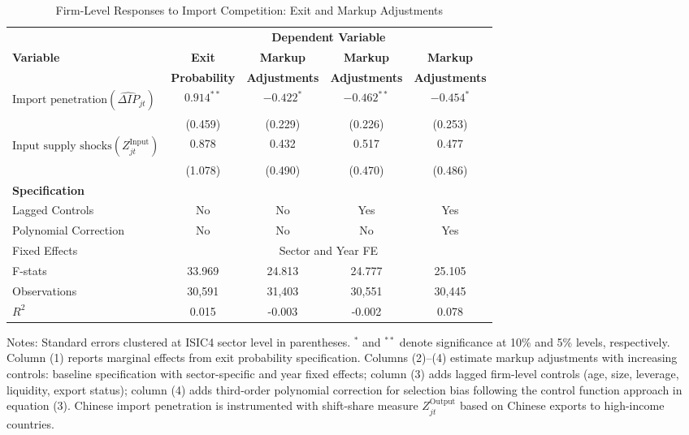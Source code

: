 \documentclass[12pt]{article}
\begin{document}
    \begin{table}[H]
    \centering
    \caption{Firm-Level Responses to Import Competition: Exit and Markup Adjustments}
    \label{tab:firm_level_responses}
    \begin{threeparttable}
    \begin{tabular}{lcccc}
    \toprule
    & \multicolumn{4}{c}{\textbf{Dependent Variable}} \\
    \cmidrule(lr){2-5}
    \textbf{Variable} & \textbf{Exit} & \textbf{Markup} & \textbf{Markup} & \textbf{Markup} \\
    & \textbf{Probability} & \textbf{Adjustments} & \textbf{Adjustments} & \textbf{Adjustments} \\
    \midrule
    $\text{Import penetration} (\widehat{\Delta IP}_{jt})$ & $0.914^{**}$ & $-0.422^{*}$ & $-0.462^{**}$ & $-0.454^{*}$ \\
    & (0.459) & (0.229) & (0.226) & (0.253) \\
    $\text{Input supply shocks} (Z_{jt}^{\text{Input}})$ & 0.878 & 0.432 & 0.517 & 0.477 \\
    & (1.078) & (0.490) & (0.470) & (0.486) \\
    \midrule
    \multicolumn{5}{l}{\textbf{Specification}} \\
    Lagged Controls & No & No & Yes & Yes \\
    Polynomial Correction & No & No & No & Yes \\
    \midrule
    Fixed Effects & \multicolumn{4}{c}{Sector and Year FE} \\
    F-stats & 33.969 & 24.813 & 24.777 & 25.105 \\
    Observations & 30,591 & 31,403 & 30,551 & 30,445 \\
    $R^2$ & 0.015 & -0.003 & -0.002 & 0.078 \\
    \bottomrule
    \end{tabular}
    \begin{tablenotes}
    \small
    \item Notes: Standard errors clustered at ISIC4 sector level in parentheses. $^{*}$ and $^{**}$ denote significance at 10\% and 5\% levels, respectively. Column (1) reports marginal effects from exit probability specification. Columns (2)--(4) estimate markup adjustments with increasing controls: baseline specification with sector-specific and year fixed effects; column (3) adds lagged firm-level controls (age, size, leverage, liquidity, export status); column (4) adds third-order polynomial correction for selection bias following the control function approach in equation (3). Chinese import penetration is instrumented with shift-share measure $Z_{jt}^{\text{Output}}$ based on Chinese exports to high-income countries.
    \end{tablenotes}
    \end{threeparttable}
    \end{table}
\end{document}
